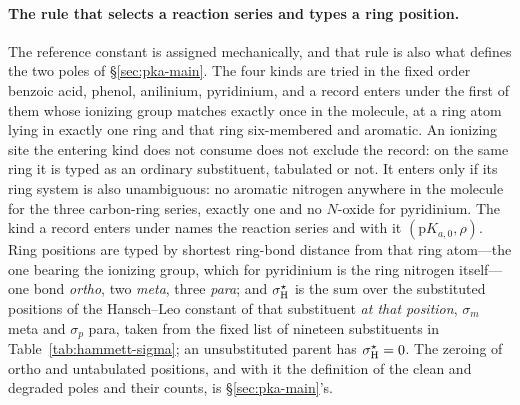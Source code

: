 \paragraph{The rule that selects a reaction series and types a ring position.}
The reference constant is assigned mechanically, and that rule is also what defines the two poles of
\S\ref{sec:pka-main}.
The four kinds are tried in the fixed order benzoic acid, phenol, anilinium, pyridinium, and a record
enters under the first of them whose ionizing group matches exactly once in the molecule, at a ring
atom lying in exactly one ring and that ring six-membered and aromatic. An ionizing site the entering
kind does not consume does not exclude the record: on the same ring it is typed as an ordinary
substituent, tabulated or not. It enters only if its ring system is also unambiguous: no aromatic nitrogen
anywhere in the molecule for the three carbon-ring series, exactly one and no $N$-oxide for
pyridinium. The kind a record enters under names the
reaction series and with it $(\mathrm pK_{a,0},\rho)$. Ring
positions are typed by shortest ring-bond distance from that ring atom---the one bearing the ionizing
group, which for pyridinium is the ring nitrogen itself---one bond \emph{ortho}, two \emph{meta},
three \emph{para}; and $\sigma_{\mathrm H}^\star$ is the sum over the substituted positions
of the Hansch--Leo constant of that substituent \emph{at that position}, $\sigma_m$ meta and
$\sigma_p$ para, taken from the fixed list of nineteen substituents in
Table~\ref{tab:hammett-sigma}; an unsubstituted parent has
$\sigma_{\mathrm H}^\star=0$. The zeroing of ortho and untabulated positions, and with it the definition of
the clean and degraded poles and their counts, is \S\ref{sec:pka-main}'s.

